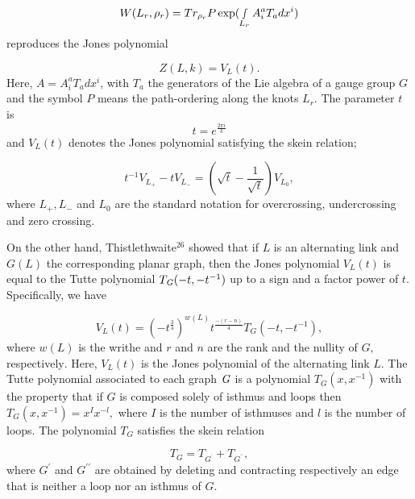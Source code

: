 \documentclass[a4paper,12pt]{article}
\begin{document}
\begin{equation}
W(L_{r},\rho _{r})=Tr_{\rho _{r}}P\exp (\smallint
_{L_{r}}A_{i}^{a}T_{a}dx^{i})  \label{33}
\end{equation}
reproduces the Jones polynomial

\begin{equation}
Z(L,k)=V_{L}(t).  \label{34}
\end{equation}
Here, $A=A_{i}^{a}T_{a}dx^{i}$, with $T_{a}$ the generators of the Lie
algebra of a gauge group $G$ and the symbol $P$ means the path-ordering
along the knots $L_{r}.$ The parameter $t$ is 
\begin{equation}
t=e^{\frac{2\pi i}{k}}  \label{35}
\end{equation}
and $V_{L}(t)$ denotes the Jones polynomial satisfying the skein relation;

\begin{equation}
t^{-1}V_{L_{+}}-tV_{L_{-}}=(\sqrt{t}-\frac{1}{\sqrt{t}})V_{L_{0}},
\label{36}
\end{equation}
where $L_{+},L_{-}$ and $L_{0}$ are the standard notation for overcrossing,
undercrossing and zero crossing.

On the other hand, Thistlethwaite$^{26}$ showed that if $L$ is an
alternating link and $\mathit{G}(L)$ the corresponding planar graph, then
the Jones polynomial $V_{L}(t)$ is equal to the Tutte polynomial $T_{\mathit{%
G}}(-t,-t^{-1})$ up to a sign and a factor power of $t.$ Specifically, we
have

\begin{equation}
V_{L}(t)=(-t^{\frac{3}{4}})^{w(L)}t^{\frac{-(r-n)}{4}}T_{\mathit{G}%
}(-t,-t^{-1}),  \label{37}
\end{equation}
where $w(L)$ is the writhe and $r$ and $n$ are the rank and the nullity of $%
\mathit{G,}$ respectively$.$ Here, $V_{L}(t)$ is the Jones polynomial of the
alternating link $L.$ The Tutte polynomial associated to each graph $\mathit{%
G}$ is a polynomial $T_{\mathit{G}}(x,x^{-1})$ with the property that if $%
\mathit{G}$ is composed solely of isthmus and loops then $T_{\mathit{G}%
}(x,x^{-1})=x^{I}x^{-l},$ where $I$ is the number of isthmuses and $l$ is
the number of loops. The polynomial $T_{\mathit{G}}$ satisfies the skein
relation

\begin{equation}
T_{\mathit{G}}=T_{\mathit{G}^{^{\prime }}}+T_{\mathit{G}^{^{\prime \prime
}}},  \label{38}
\end{equation}
where $\mathit{G}^{\prime }$ and $\mathit{G}^{\prime \prime }$ are obtained
by deleting and contracting respectively an edge that is neither a loop nor
an isthmus of $\mathit{G}$.
\end{document}
